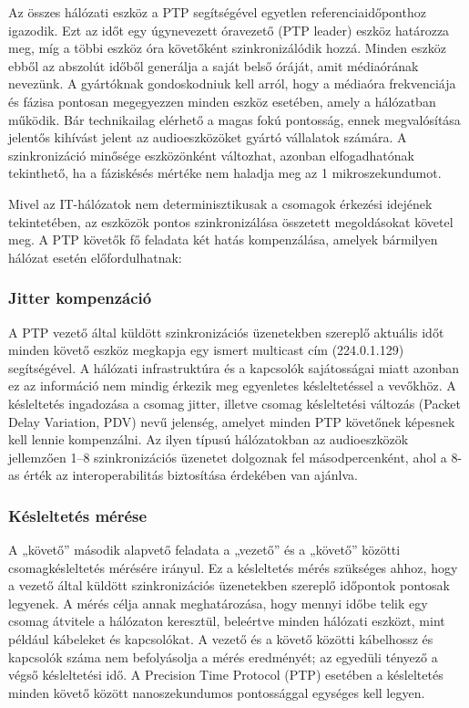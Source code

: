Az összes hálózati eszköz a PTP segítségével egyetlen referenciaidőponthoz igazodik. Ezt az időt egy 
úgynevezett óravezető (PTP leader) eszköz határozza meg, míg a többi eszköz óra követőként szinkronizálódik hozzá. 
Minden eszköz ebből az abszolút időből generálja a saját belső óráját, amit médiaórának nevezünk. 
A gyártóknak gondoskodniuk kell arról, hogy a médiaóra frekvenciája és fázisa pontosan megegyezzen minden eszköz 
esetében, amely a hálózatban működik. Bár technikailag elérhető a magas fokú pontosság, ennek megvalósítása jelentős kihívást 
jelent az audioeszközöket gyártó vállalatok számára. 
A szinkronizáció minősége eszközönként változhat, azonban elfogadhatónak tekinthető, ha a fáziskésés mértéke nem haladja meg az 1 mikroszekundumot.

Mivel az IT-hálózatok nem determinisztikusak a csomagok érkezési idejének tekintetében, az eszközök pontos
szinkronizálása összetett megoldásokat követel meg. 
A PTP követők fő feladata két hatás kompenzálása, amelyek bármilyen hálózat esetén előfordulhatnak:
\subsubsection{Jitter kompenzáció}
A PTP vezető által küldött szinkronizációs üzenetekben szereplő aktuális időt minden követő eszköz 
megkapja egy ismert multicast cím (224.0.1.129) segítségével. A hálózati infrastruktúra és a 
kapcsolók sajátosságai miatt azonban ez az információ nem mindig érkezik meg egyenletes késleltetéssel a vevőkhöz. 
A késleltetés ingadozása a csomag jitter, illetve csomag késleltetési változás (Packet Delay Variation, PDV) 
nevű jelenség, amelyet minden PTP követőnek képesnek kell lennie kompenzálni. 
Az ilyen típusú hálózatokban az audioeszközök jellemzően 1–8 szinkronizációs üzenetet dolgoznak fel másodpercenként, 
ahol a 8-as érték az interoperabilitás biztosítása érdekében van ajánlva.

\subsubsection{Késleltetés mérése}
A „követő” második alapvető feladata a „vezető” és a „követő” közötti csomagkésleltetés mérésére irányul. 
Ez a késleltetés mérés szükséges ahhoz, hogy a vezető által küldött szinkronizációs üzenetekben szereplő időpontok pontosak legyenek. 
A mérés célja annak meghatározása, hogy mennyi időbe telik egy csomag átvitele a hálózaton keresztül, 
beleértve minden hálózati eszközt, mint például kábeleket és kapcsolókat. A vezető és a követő közötti 
kábelhossz és kapcsolók száma nem befolyásolja a mérés eredményét; az egyedüli tényező a végső késleltetési idő. 
A Precision Time Protocol (PTP) esetében a késleltetés minden követő között nanoszekundumos pontossággal egységes kell legyen.

